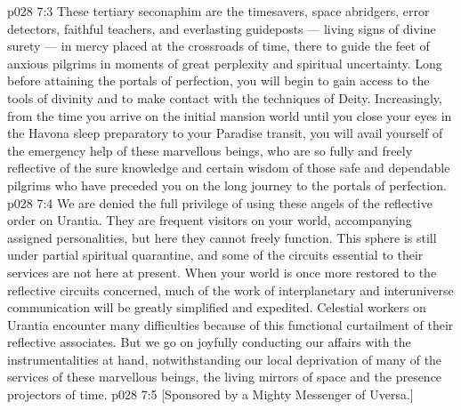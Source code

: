\vs p028 7:3 These tertiary seconaphim are the timesavers, space abridgers, error detectors, faithful teachers, and everlasting guideposts --- living signs of divine surety --- in mercy placed at the crossroads of time, there to guide the feet of anxious pilgrims in moments of great perplexity and spiritual uncertainty. Long before attaining the portals of perfection, you will begin to gain access to the tools of divinity and to make contact with the techniques of Deity. Increasingly, from the time you arrive on the initial mansion world until you close your eyes in the Havona sleep preparatory to your Paradise transit, you will avail yourself of the emergency help of these marvellous beings, who are so fully and freely reflective of the sure knowledge and certain wisdom of those safe and dependable pilgrims who have preceded you on the long journey to the portals of perfection.
\vs p028 7:4 We are denied the full privilege of using these angels of the reflective order on Urantia. They are frequent visitors on your world, accompanying assigned personalities, but here they cannot freely function. This sphere is still under partial spiritual quarantine, and some of the circuits essential to their services are not here at present. When your world is once more restored to the reflective circuits concerned, much of the work of interplanetary and interuniverse communication will be greatly simplified and expedited. Celestial workers on Urantia encounter many difficulties because of this functional curtailment of their reflective associates. But we go on joyfully conducting our affairs with the instrumentalities at hand, notwithstanding our local deprivation of many of the services of these marvellous beings, the living mirrors of space and the presence projectors of time.
\vsetoff
\vs p028 7:5 [Sponsored by a Mighty Messenger of Uversa.]
